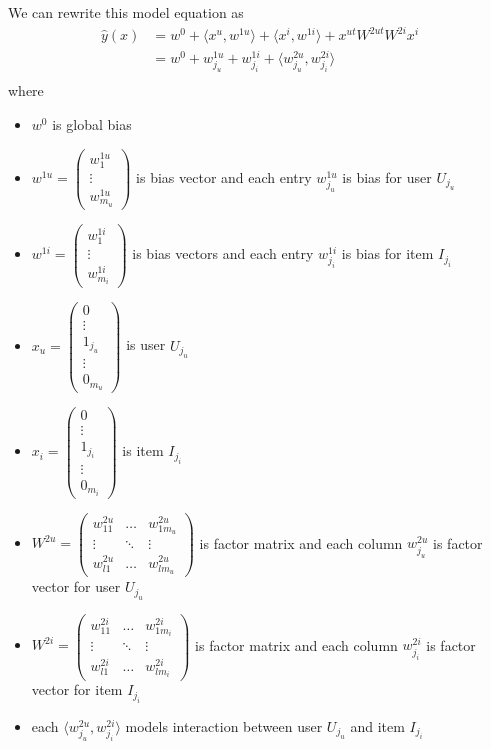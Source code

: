 \documentclass[14pt, reqno]{amsart}
\theoremstyle{definition}
\begin{document}
We can rewrite this model equation as
\begin{align*}
\hat{y}(x) & = w^0 + \langle x^u, w^{1u} \rangle + \langle x^i, w^{1i} \rangle + x^{ut} W^{2ut} W^{2i} x^i \\
 & = w^0 + w_{j_u}^{1u} + w_{j_i}^{1i} + \langle w_{j_u}^{2u}, w_{j_i}^{2i} \rangle \\
\end{align*}
where
\begin{itemize}
\item $w^0$ is global bias
\item $w^{1u} = \left( \begin{array}{c} w_1^{1u} \\ \vdots \\ w_{m_u}^{1u} \end{array} \right)$ is bias vector and each entry $w_{j_u}^{1u}$ is bias for user $U_{j_u}$
\item $w^{1i} = \left( \begin{array}{c} w_1^{1i} \\ \vdots \\ w_{m_i}^{1i} \end{array} \right)$ is bias vectors and each entry $w_{j_i}^{1i}$ is bias for item $I_{j_i}$
\item $x_u = \left( \begin{array}{c} 0 \\ \vdots \\ 1_{j_u} \\ \vdots \\ 0_{m_u} \end{array} \right)$ is user $U_{j_u}$\\
\item $x_i = \left( \begin{array}{c} 0 \\ \vdots \\ 1_{j_i} \\ \vdots \\ 0_{m_i} \end{array} \right)$ is item $I_{j_i}$ \\
\item $W^{2u} = \left( \begin{array}{ccc} w_{11}^{2u} & \dots & w_{1m_u}^{2u} \\ \vdots & \ddots & \vdots \\ w_{l1}^{2u} & \dots & w_{lm_u}^{2u} \end{array} \right)$ is factor matrix and each column $w_{j_u}^{2u}$ is factor vector for user $U_{j_u}$
\item  $W^{2i} = \left( \begin{array}{ccc} w_{11}^{2i} & \dots & w_{1m_i}^{2i} \\ \vdots & \ddots & \vdots \\ w_{l1}^{2i} & \dots & w_{lm_i}^{2i} \end{array} \right)$ is factor matrix and each column $w_{j_i}^{2i}$ is factor vector for item $I_{j_i}$
\item each $\langle w_{j_u}^{2u}, w_{j_i}^{2i} \rangle$ models interaction between user $U_{j_u}$ and item $I_{j_i}$
\end{itemize}
\end{document}
